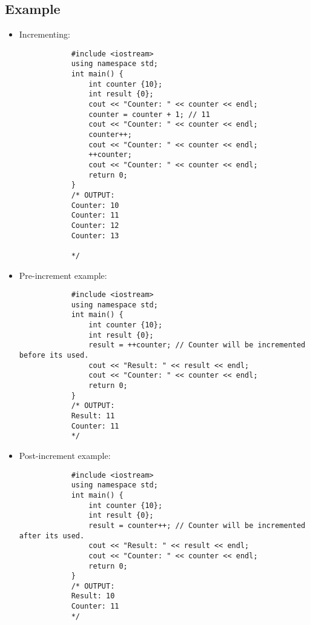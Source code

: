 \subsection{Example}
\begin{itemize}
    \item Incrementing: 
        \begin{verbatim}
            #include <iostream>
            using namespace std;
            int main() {
                int counter {10};
                int result {0};
                cout << "Counter: " << counter << endl;
                counter = counter + 1; // 11
                cout << "Counter: " << counter << endl;
                counter++;
                cout << "Counter: " << counter << endl;
                ++counter;
                cout << "Counter: " << counter << endl;
                return 0;
            }
            /* OUTPUT:
            Counter: 10
            Counter: 11
            Counter: 12
            Counter: 13

            */
        \end{verbatim}
    
    \item Pre-increment example: 
        \begin{verbatim}
            #include <iostream>
            using namespace std;
            int main() {
                int counter {10};
                int result {0};
                result = ++counter; // Counter will be incremented before its used.
                cout << "Result: " << result << endl;
                cout << "Counter: " << counter << endl;
                return 0;
            }
            /* OUTPUT:
            Result: 11
            Counter: 11
            */
        \end{verbatim}
    
    \item Post-increment example: 
        \begin{verbatim}
            #include <iostream>
            using namespace std;
            int main() {
                int counter {10};
                int result {0};
                result = counter++; // Counter will be incremented after its used.
                cout << "Result: " << result << endl;
                cout << "Counter: " << counter << endl;
                return 0;
            }
            /* OUTPUT:
            Result: 10
            Counter: 11
            */
        \end{verbatim}
    

\end{itemize}
